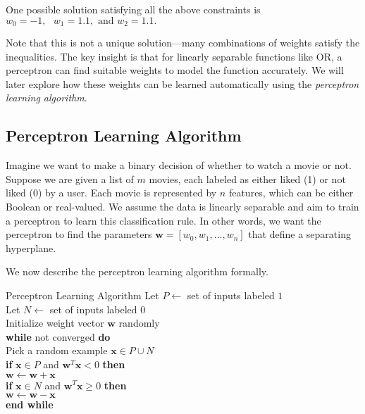 One possible solution satisfying all the above constraints is
\(
w_0 = -1, \text{ } w_1 = 1.1, \text{ and } w_2 = 1.1. 
\)

Note that this is not a unique solution—many combinations of weights satisfy the inequalities. The key insight is that for linearly separable functions like OR, a perceptron can find suitable weights to model the function accurately. We will later explore how these weights can be learned automatically using the \textit{perceptron learning algorithm}.

\subsection{Perceptron Learning Algorithm}

Imagine we want to make a binary decision of whether to watch a movie or not. Suppose we are given a list of $m$ movies, each labeled as either liked (1) or not liked (0) by a user. Each movie is represented by $n$ features, which can be either Boolean or real-valued. We assume the data is linearly separable and aim to train a perceptron to learn this classification rule. In other words, we want the perceptron to find the parameters $\mathbf{w} = [w_0, w_1, \ldots, w_n]$ that define a separating hyperplane.

We now describe the perceptron learning algorithm formally.

\begin{algobox}{Perceptron Learning Algorithm}
Let $P \gets$ set of inputs labeled $1$ \\
 Let $N \gets$ set of inputs labeled $0$ \\
 Initialize weight vector $\mathbf{w}$ randomly \\
 \textbf{while} not converged \textbf{do} \\
\hspace*{1em}  Pick a random example $\mathbf{x} \in P \cup N$ \\
\hspace*{1em}  \textbf{if} $\mathbf{x} \in P$ and $\mathbf{w}^T \mathbf{x} < 0$ \textbf{then} \\
\hspace*{2em}  $\mathbf{w} \gets \mathbf{w} + \mathbf{x}$ \\
\hspace*{1em}  \textbf{if} $\mathbf{x} \in N$ and $\mathbf{w}^T \mathbf{x} \geq 0$ \textbf{then} \\
\hspace*{2em}  $\mathbf{w} \gets \mathbf{w} - \mathbf{x}$ \\
 \textbf{end while}
\end{algobox}

